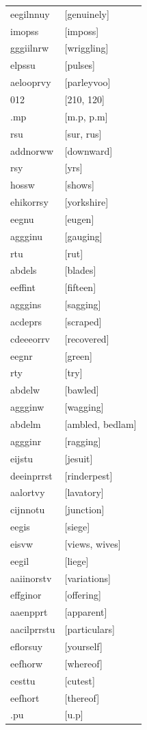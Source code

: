 \documentclass{article}
\begin{document}
\begin{tabular}{ll}
eegilnnuy & [genuinely] \\
imopss & [imposs] \\
gggiilnrw & [wriggling] \\
elpssu & [pulses] \\
aelooprvy & [parleyvoo] \\
012 & [210, 120] \\
.mp & [m.p, p.m] \\
rsu & [sur, rus] \\
addnorww & [downward] \\
rsy & [yrs] \\
hossw & [shows] \\
ehikorrsy & [yorkshire] \\
eegnu & [eugen] \\
aggginu & [gauging] \\
rtu & [rut] \\
abdels & [blades] \\
eeffint & [fifteen] \\
agggins & [sagging] \\
acdeprs & [scraped] \\
cdeeeorrv & [recovered] \\
eegnr & [green] \\
rty & [try] \\
abdelw & [bawled] \\
aggginw & [wagging] \\
abdelm & [ambled, bedlam] \\
aggginr & [ragging] \\
eijstu & [jesuit] \\
deeinprrst & [rinderpest] \\
aalortvy & [lavatory] \\
cijnnotu & [junction] \\
eegis & [siege] \\
eisvw & [views, wives] \\
eegil & [liege] \\
aaiinorstv & [variations] \\
effginor & [offering] \\
aaenpprt & [apparent] \\
aacilprrstu & [particulars] \\
eflorsuy & [yourself] \\
eefhorw & [whereof] \\
cesttu & [cutest] \\
eefhort & [thereof] \\
.pu & [u.p] \\

\end{tabular}
\end{document}
